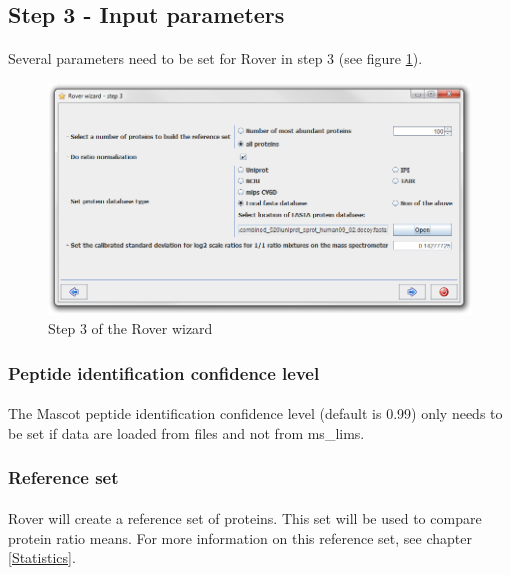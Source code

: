 \documentclass[11pt,a4paper,oneside,notitlepage]{book}
\begin{document}
\subsection{Step 3 - Input parameters}
\paragraph{}Several parameters need to be set for Rover in step 3 (see figure \ref{step3}).

\begin{figure}[H]
\begin{center}
\includegraphics[scale=0.4]{Rover_wizard_-_step_3_S.png}
\caption{Step 3 of the Rover wizard}
\label{step3}
\end{center}
\end{figure}

\subsubsection{Peptide identification confidence level}

\paragraph{}The Mascot peptide identification confidence level (default is 0.99) only needs to be set if data are loaded from files and not from ms\_lims. 

\subsubsection{Reference set}\label{Reference set}

\paragraph{}Rover will create a reference set of proteins. This set will be used to compare protein ratio means. For more information on this reference set, see chapter \ref{Statistics}.
\end{document}
